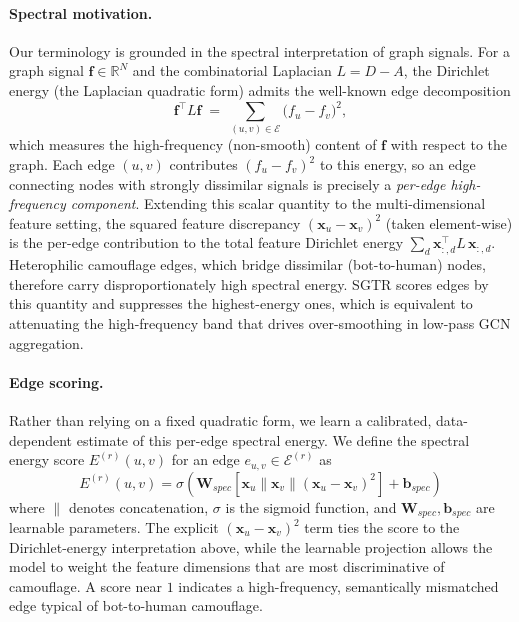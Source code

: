 \paragraph{Spectral motivation.}
Our terminology is grounded in the spectral interpretation of graph signals. For a graph signal $\mathbf{f}\in\mathbb{R}^N$ and the combinatorial Laplacian $L = D - A$, the Dirichlet energy (the Laplacian quadratic form) admits the well-known edge decomposition
\begin{equation}
    \mathbf{f}^\top L \mathbf{f} \;=\; \sum_{(u,v)\in\mathcal{E}} \big(f_u - f_v\big)^2 ,
    \label{eq:dirichlet}
\end{equation}
which measures the high-frequency (non-smooth) content of $\mathbf{f}$ with respect to the graph. Each edge $(u,v)$ contributes $(f_u-f_v)^2$ to this energy, so an edge connecting nodes with strongly dissimilar signals is precisely a \emph{per-edge high-frequency component}. Extending this scalar quantity to the multi-dimensional feature setting, the squared feature discrepancy $(\mathbf{x}_u - \mathbf{x}_v)^2$ (taken element-wise) is the per-edge contribution to the total feature Dirichlet energy $\sum_d \mathbf{x}_{:,d}^\top L\,\mathbf{x}_{:,d}$. Heterophilic camouflage edges, which bridge dissimilar (bot-to-human) nodes, therefore carry disproportionately high spectral energy. SGTR scores edges by this quantity and suppresses the highest-energy ones, which is equivalent to attenuating the high-frequency band that drives over-smoothing in low-pass GCN aggregation.

\paragraph{Edge scoring.}
Rather than relying on a fixed quadratic form, we learn a calibrated, data-dependent estimate of this per-edge spectral energy. We define the spectral energy score $E^{(r)}(u,v)$ for an edge $e_{u,v}\in\mathcal{E}^{(r)}$ as
\begin{equation}
    E^{(r)}(u,v) = \sigma \left( \mathbf{W}_{spec} [\mathbf{x}_u \parallel \mathbf{x}_v \parallel (\mathbf{x}_u - \mathbf{x}_v)^2] + \mathbf{b}_{spec} \right)
\end{equation}
where $\parallel$ denotes concatenation, $\sigma$ is the sigmoid function, and $\mathbf{W}_{spec},\mathbf{b}_{spec}$ are learnable parameters. The explicit $(\mathbf{x}_u-\mathbf{x}_v)^2$ term ties the score to the Dirichlet-energy interpretation above, while the learnable projection allows the model to weight the feature dimensions that are most discriminative of camouflage. A score near $1$ indicates a high-frequency, semantically mismatched edge typical of bot-to-human camouflage.

